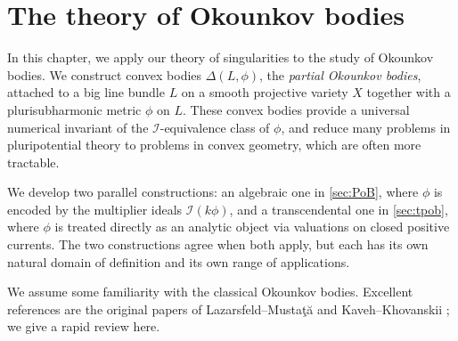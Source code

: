 \chapter{The theory of Okounkov bodies}
\label{chap:Okounkov}

In this chapter, we apply our theory of singularities to the study of Okounkov bodies. We construct convex bodies $\Delta(L,\phi)$, the \emph{partial Okounkov bodies}, attached to a big line bundle $L$ on a smooth projective variety $X$ together with a plurisubharmonic metric $\phi$ on $L$. These convex bodies provide a universal numerical invariant of the $\mathcal{I}$-equivalence class of $\phi$, and reduce many problems in pluripotential theory to problems in convex geometry, which are often more tractable.

We develop two parallel constructions: an algebraic one in \cref{sec:PoB}, where $\phi$ is encoded by the multiplier ideals $\mathcal{I}(k\phi)$, and a transcendental one in \cref{sec:tpob}, where $\phi$ is treated directly as an analytic object via valuations on closed positive currents. The two constructions agree when both apply, but each has its own natural domain of definition and its own range of applications.

We assume some familiarity with the classical Okounkov bodies. Excellent references are the original papers of Lazarsfeld--Musta\c{t}\u{a} \cite{LM09} and Kaveh--Khovanskii \cite{KK12}; we give a rapid review here.

